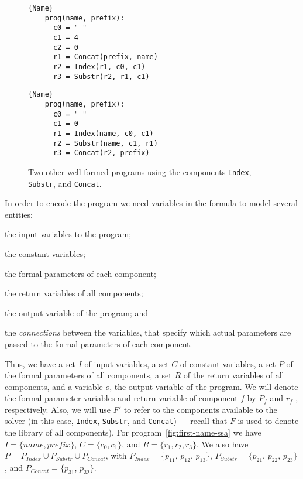 \begin{figure}
\noindent
\begin{minipage}{.45\textwidth}
  \begin{lstlisting}[frame=tlrb]{Name}
    prog(name, prefix):
      c0 = " "
      c1 = 4
      c2 = 0
      r1 = Concat(prefix, name)
      r2 = Index(r1, c0, c1)
      r3 = Substr(r2, r1, c1)
  \end{lstlisting}
\end{minipage}\hfill
\begin{minipage}{.45\textwidth}
  \begin{lstlisting}[frame=tlrb]{Name}
    prog(name, prefix):
      c0 = " "
      c1 = 0
      r1 = Index(name, c0, c1)
      r2 = Substr(name, c1, r1)
      r3 = Concat(r2, prefix)
\end{lstlisting}
\end{minipage}
\caption{Two other well-formed programs using the components \lstinline{Index},
  \lstinline{Substr}, and \lstinline{Concat}.}
\label{fig:other-valid-programs}
\end{figure}

In order to encode the program we need variables in the formula to model several
entities:
\begin{enumerate*}[(1)]
\item the input variables to the program;
\item the constant variables;
\item the formal parameters of each component;
\item the return variables of all components;
\item the output variable of the program; and
\item the \textit{connections} between the variables, that specify which
  actual parameters are passed to the formal parameters of each component.
\end{enumerate*}
Thus, we have a set $I$ of input variables, a set $C$ of constant variables, a
set $P$ of the formal parameters of all components, a set $R$ of the return
variables of all components, and a variable $o$, the output variable of the
program. We will denote the formal parameter variables and return variable of
component $f$ by $P_f$ and $r_f$ , respectively. Also, we will use $F'$ to refer
to the components available to the solver (in this case, \lstinline{Index},
\lstinline{Substr}, and \lstinline{Concat}) --- recall that $F$ is used to
denote the library of all components).
For program~\ref{fig:first-name-ssa} we have $I = \{name, prefix\}$,
$C = \{c_0, c_1\}$, and $R = \{r_1, r_2, r_3\}$. We also have
$P = P_{Index} \cup P_{Substr} \cup P_{Concat}$, with
$P_{Index} = \{p_{11}$, $p_{12}$, $p_{13}\}$,
$P_{Substr} = \{p_{21}$, $p_{22}$, $p_{23}\}$, and
$P_{Concat} = \{p_{31}$, $p_{32}\}$.

